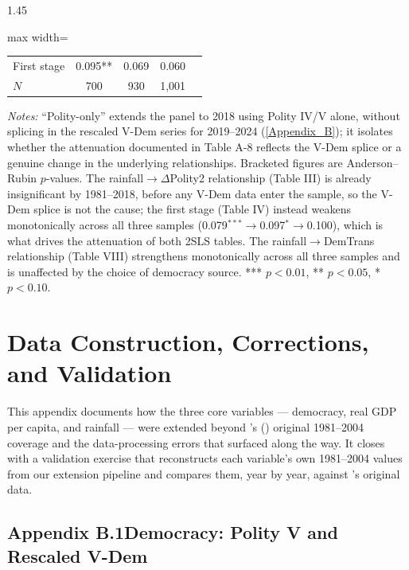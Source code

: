 \documentclass[12pt]{article}
\begin{document}
\begin{bibunit}[jpe]
\begin{spacing}{1.45}
\begin{table}[H]
\begin{adjustbox}{max width=\textwidth}
\begin{threeparttable}
\begin{tabular}{lcccc}
First stage & 0.095** & 0.069 & 0.060 \\
$N$          & 700 & 930 & 1{,}001 \\
\bottomrule
\end{tabular}
\begin{tablenotes}[flushleft]
\footnotesize
\item \textit{Notes:} ``Polity-only'' extends the panel to 2018 using Polity IV/V alone, without splicing in the rescaled V-Dem series for 2019--2024 (\ref{Appendix_B}); it isolates whether the attenuation documented in Table A-8 reflects the V-Dem splice or a genuine change in the underlying relationships. Bracketed figures are Anderson--Rubin $p$-values. The rainfall$\to\Delta$Polity2 relationship (Table III) is already insignificant by 1981--2018, before any V-Dem data enter the sample, so the V-Dem splice is not the cause; the first stage (Table IV) instead weakens monotonically across all three samples (0.079$^{***}\to$0.097$^{*}\to$0.100), which is what drives the attenuation of both 2SLS tables. The rainfall$\to$DemTrans relationship (Table VIII) strengthens monotonically across all three samples and is unaffected by the choice of democracy source. *** $p<0.01$, ** $p<0.05$, * $p<0.10$.
\end{tablenotes}
\end{threeparttable}
\end{adjustbox}
\end{table}

\section{Data Construction, Corrections, and Validation\label{Appendix_B}}

This appendix documents how the three core variables --- democracy, real GDP per capita, and rainfall --- were extended beyond \citeauthor{bruckner2011rain}'s (\citeyear{bruckner2011rain}) original 1981--2004 coverage and the data-processing errors that surfaced along the way. It closes with a validation exercise that reconstructs each variable's own 1981--2004 values from our extension pipeline and compares them, year by year, against \citeauthor{bruckner2011rain}'s original data.

\subsection*{Appendix B.1\quad Democracy: Polity V and Rescaled V-Dem}


\end{spacing}
\end{bibunit}
\end{document}
